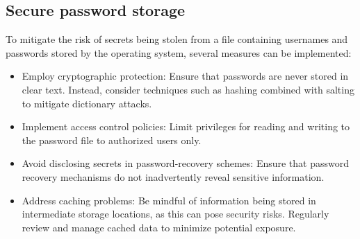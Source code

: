 \subsection{Secure password storage}
To mitigate the risk of secrets being stolen from a file containing usernames and passwords stored by the operating system, several measures can be implemented:
\begin{itemize}
    \item Employ cryptographic protection: Ensure that passwords are never stored in clear text. 
        Instead, consider techniques such as hashing combined with salting to mitigate dictionary attacks.
    \item Implement access control policies: Limit privileges for reading and writing to the password file to authorized users only.
    \item Avoid disclosing secrets in password-recovery schemes: Ensure that password recovery mechanisms do not inadvertently reveal sensitive information.
    \item Address caching problems: Be mindful of information being stored in intermediate storage locations, as this can pose security risks. 
        Regularly review and manage cached data to minimize potential exposure.
\end{itemize}
